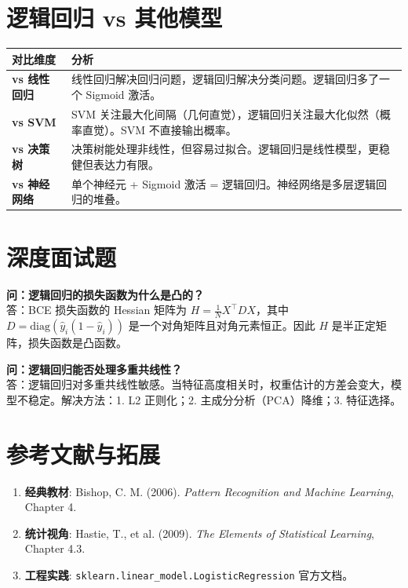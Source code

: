 \documentclass[12pt, a4paper]{book}
\begin{document}
\section{逻辑回归 vs 其他模型}
\begin{table}[h]
\centering
\begin{tabularx}{\textwidth}{|l|X|}
\hline
\textbf{对比维度} & \textbf{分析} \\
\hline
\textbf{vs 线性回归} & 线性回归解决回归问题，逻辑回归解决分类问题。逻辑回归多了一个 Sigmoid 激活。 \\
\hline
\textbf{vs SVM} & SVM 关注最大化间隔（几何直觉），逻辑回归关注最大化似然（概率直觉）。SVM 不直接输出概率。 \\
\hline
\textbf{vs 决策树} & 决策树能处理非线性，但容易过拟合。逻辑回归是线性模型，更稳健但表达力有限。 \\
\hline
\textbf{vs 神经网络} & 单个神经元 + Sigmoid 激活 = 逻辑回归。神经网络是多层逻辑回归的堆叠。 \\
\hline
\end{tabularx}
\end{table}

\section{深度面试题}

\textbf{问：逻辑回归的损失函数为什么是凸的？}\\
答：BCE 损失函数的 Hessian 矩阵为 $H = \frac{1}{N} X^\top D X$，其中 $D = \text{diag}(\hat{y}_i(1-\hat{y}_i))$ 是一个对角矩阵且对角元素恒正。因此 $H$ 是半正定矩阵，损失函数是凸函数。

\textbf{问：逻辑回归能否处理多重共线性？}\\
答：逻辑回归对多重共线性敏感。当特征高度相关时，权重估计的方差会变大，模型不稳定。解决方法：1. L2 正则化；2. 主成分分析（PCA）降维；3. 特征选择。

\section{参考文献与拓展}
\begin{enumerate}
    \item \textbf{经典教材}: Bishop, C. M. (2006). \textit{Pattern Recognition and Machine Learning}, Chapter 4.
    \item \textbf{统计视角}: Hastie, T., et al. (2009). \textit{The Elements of Statistical Learning}, Chapter 4.3.
    \item \textbf{工程实践}: \texttt{sklearn.linear\_model.LogisticRegression} 官方文档。
\end{enumerate}
\end{document}
